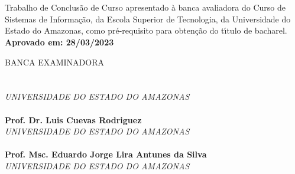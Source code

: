 
\begin{center}
\bf \MakeUppercase{\nome}\\[1.5 cm]
\end{center}

\begin{center}
\bf \MakeUppercase{\titulo}\\[1.5cm]
\end{center}

\hspace*{8cm}
\begin{minipage}{8cm}

Trabalho de Conclus\~{a}o de Curso apresentado \`{a}
banca avaliadora do Curso de Sistemas de Informação,
da Escola Superior de Tecnologia, da Universidade do Estado do Amazonas,
como pr\'e-requisito para obten\c{c}\~{a}o do t\'{\i}tulo de bacharel.\\

\large \bf Aprovado em: 28/03/2023
\end{minipage}

BANCA EXAMINADORA\\[12 pt]

\noindent \hrulefill \hspace*{6cm} \\
\noindent \textbf{\orientador}\\
\textit{UNIVERSIDADE DO ESTADO DO AMAZONAS}\\[0.5cm]

\noindent \hrulefill \hspace*{6cm} \\
\noindent \textbf{Prof. Dr. Luis Cuevas Rodriguez}\\
\textit{UNIVERSIDADE DO ESTADO DO AMAZONAS}\\[0.5cm]

\noindent \hrulefill \hspace*{6cm} \\
\noindent \textbf{Prof. Msc. Eduardo Jorge Lira Antunes da Silva}\\
\textit{UNIVERSIDADE DO ESTADO DO AMAZONAS}\\
